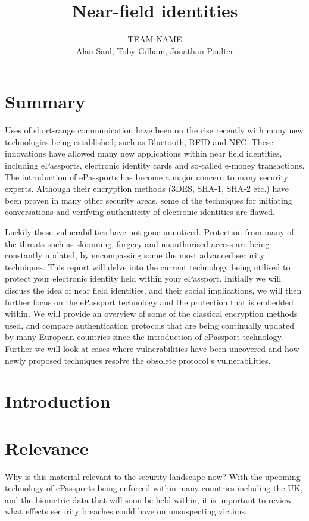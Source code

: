 \documentclass[12pt]{article}
\title{Near-field identities}
\author{TEAM NAME\\Alan Saul, Toby Gilham, Jonathan Poulter}
\date{}                                           %
\begin{document}
\maketitle
\newpage
\section{Summary}
{\color{red}{Executive summary of not more than one page, which summarises the content of the report.}}

Uses of short-range communication have been on the rise recently with many new technologies being established; such as Bluetooth, RFID and NFC. These innovations have allowed many new applications within near field identities, including ePassports, electronic identity cards and so-called e-money transactions. The introduction of ePassports has become a major concern to many security experts. Although their encryption methods (3DES, SHA-1, SHA-2 etc.) have been proven in many other security areas, some of the techniques for initiating conversations and verifying authenticity of electronic identities are flawed.

Luckily these vulnerabilities have not gone unnoticed. Protection from many of the threats such as skimming, forgery and unauthorised access are being constantly updated, by encompassing some the most advanced security techniques. 
This report will delve into the current technology being utilised to protect your electronic identity held within your ePassport. Initially we will discuss the idea of near field identities, and their social implications, we will then further focus on the ePassport technology and the protection that is embedded within. We will provide an overview of some of the classical encryption methods used, and compare authentication protocols that are being continually updated by many European countries since the introduction of ePassport technology. Further we will look at cases where vulnerabilities have been uncovered and how newly proposed techniques resolve the obsolete protocol's vulnerabilities.

\section{Introduction}
{\color{red}{Introduce the idea of near field identities, where they are likely to lead 
TODO}}

\section{Relevance}
Why is this material relevant to the security landscape now?
With the upcoming technology of ePassports being enforced within many countries including the UK, and the biometric data that will soon be held within, it is important to review what effects security breaches could have on unsuspecting victims.
\end{document}
